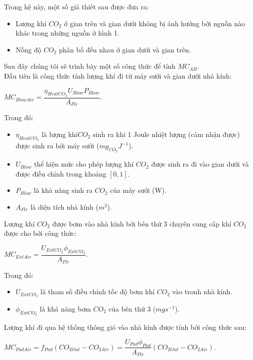 \documentclass[a4paper]{article}
\begin{document}
	    Trong hệ này, một số giả thiết sau được đưa ra:
	    \begin{itemize}
	        \item Lượng khí $CO_2$ ở gian trên và gian dưới không bị ảnh hưởng bởi nguồn nào khác trong những nguồn ở hình 1.
	        \item Nồng độ $CO_2$ phân bố đều nhau ở gian dưới và gian trên.
	    \end{itemize}
	    Sau đây chúng tôi sẽ trình bày một số công thức để tính $MC_{AB}$.\\
	    Đầu tiên là công thức tính lượng khí đi từ máy sưởi và gian dưới nhà kính:
	    \begin{center}
	        $MC_{BlowAir} = \dfrac{\eta_{HeatCO_2}U_{Blow}P_{Blow}}{A_{Flr}}.$
	    \end{center}
	    Trong đó:
	    \begin{itemize}
	        \item $\eta_{HeatCO_2}$ là lượng khí$CO_2$ sinh ra khi 1 Joule nhiệt lượng (cảm nhận được) được sinh ra bới máy sưởi ($mg_{CO_2}J^{-1}$).
	        \item $U_{Blow}$ thể hiện mức cho phép lượng khí $CO_2$ được sinh ra đi vào gian dưới và được điều chỉnh trong khoảng $[0,1]$.
	       \item $P_{Blow}$ là khả năng sinh ra $CO_2$ của máy sưởi (W).
	       \item $A_{Flr}$ là diện tích nhà kính ($m^2$).
	    \end{itemize}
	    \vspace{5mm}
	    Lượng khí $CO_2$ được bơm vào nhà kính bởi bên thứ 3 chuyên cung cấp khí $CO_2$ được cho bởi công thức:
	    \begin{center}
	        $MC_{ExtAir} = \dfrac{U_{ExtCO_2}\phi_{ExtCO_2}}{A_{Flr}}.$
	    \end{center}
	    Trong đó:
	    \begin{itemize}
	        \item $U_{ExtCO_2}$ là tham số điều chỉnh tốc độ bơm khí $CO_2$ vào tronh nhà kính.
	       \item $\phi_{ExtCO_2}$ là khả năng bơm $CO_2$ của bên thứ 3 ($mg s^{-1}$).
	    \end{itemize}
	    \vspace{5mm}
	    Lượng khí đi qua hệ thống thông gió vào nhà kính được tính bởi công thức sau:
	    \begin{center}
	        $MC_{PadAir} = f_{Pad}(CO_{2Out} - CO_{2Air}) = \dfrac{U_{Pad}\phi_{Pad}}{A_{Flr}}(CO_{2Out}-CO_{2Air}).$
	    \end{center}
\end{document}
